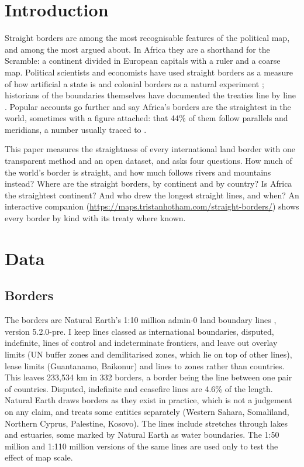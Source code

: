 \documentclass[11pt,a4paper]{article}
\begin{document}
\section{Introduction}
Straight borders are among the most recognisable features of the political map, and among the most argued about. In Africa they are a shorthand for the Scramble: a continent divided in European capitals with a ruler and a coarse map. Political scientists and economists have used straight borders as a measure of how artificial a state is \citep{alesina2011} and colonial borders as a natural experiment \citep{michalopoulos2016}; historians of the boundaries themselves have documented the treaties line by line \citep{brownlie1979,biger1995,prescott2008}. Popular accounts go further and say Africa's borders are the straightest in the world, sometimes with a figure attached: that 44\% of them follow parallels and meridians, a number usually traced to \citet{barbour1961}.

This paper measures the straightness of every international land border with one transparent method and an open dataset, and asks four questions. How much of the world's border is straight, and how much follows rivers and mountains instead? Where are the straight borders, by continent and by country? Is Africa the straightest continent? And who drew the longest straight lines, and when? An interactive companion (\url{https://maps.tristanhotham.com/straight-borders/}) shows every border by kind with its treaty where known.

\section{Data}
\subsection{Borders}
The borders are Natural Earth's 1:10 million admin-0 land boundary lines \citep{naturalearth}, version 5.2.0-pre. I keep lines classed as international boundaries, disputed, indefinite, lines of control and indeterminate frontiers, and leave out overlay limits (UN buffer zones and demilitarised zones, which lie on top of other lines), lease limits (Guantanamo, Baikonur) and lines to zones rather than countries. This leaves 233,534 km in 332 borders, a border being the line between one pair of countries. Disputed, indefinite and ceasefire lines are 4.6\% of the length. Natural Earth draws borders as they exist in practice, which is not a judgement on any claim, and treats some entities separately (Western Sahara, Somaliland, Northern Cyprus, Palestine, Kosovo). The lines include stretches through lakes and estuaries, some marked by Natural Earth as water boundaries. The 1:50 million and 1:110 million versions of the same lines are used only to test the effect of map scale.
\end{document}
